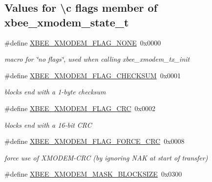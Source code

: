 \subsection*{Values for \textbackslash{}c flags member of xbee\-\_\-xmodem\-\_\-state\-\_\-t}
\begin{DoxyCompactItemize}
\item 
\hypertarget{group__util__xmodem_ga04349c37c905b515c4a61bbfbfefcac9}{\#define \hyperlink{group__util__xmodem_ga04349c37c905b515c4a61bbfbfefcac9}{X\-B\-E\-E\-\_\-\-X\-M\-O\-D\-E\-M\-\_\-\-F\-L\-A\-G\-\_\-\-N\-O\-N\-E}~0x0000}\label{group__util__xmodem_ga04349c37c905b515c4a61bbfbfefcac9}

\begin{DoxyCompactList}\small\item\em macro for \char`\"{}no flags\char`\"{}, used when calling xbee\-\_\-xmodem\-\_\-tx\-\_\-init \end{DoxyCompactList}\item 
\hypertarget{group__util__xmodem_ga3410ae9b9e3d434bb735ba6b6705f9f4}{\#define \hyperlink{group__util__xmodem_ga3410ae9b9e3d434bb735ba6b6705f9f4}{X\-B\-E\-E\-\_\-\-X\-M\-O\-D\-E\-M\-\_\-\-F\-L\-A\-G\-\_\-\-C\-H\-E\-C\-K\-S\-U\-M}~0x0001}\label{group__util__xmodem_ga3410ae9b9e3d434bb735ba6b6705f9f4}

\begin{DoxyCompactList}\small\item\em blocks end with a 1-\/byte checksum \end{DoxyCompactList}\item 
\hypertarget{group__util__xmodem_ga84ededd1cb6ac229e18cd5936943aa9e}{\#define \hyperlink{group__util__xmodem_ga84ededd1cb6ac229e18cd5936943aa9e}{X\-B\-E\-E\-\_\-\-X\-M\-O\-D\-E\-M\-\_\-\-F\-L\-A\-G\-\_\-\-C\-R\-C}~0x0002}\label{group__util__xmodem_ga84ededd1cb6ac229e18cd5936943aa9e}

\begin{DoxyCompactList}\small\item\em blocks end with a 16-\/bit C\-R\-C \end{DoxyCompactList}\item 
\hypertarget{group__util__xmodem_ga6c1de4e76820a95412e7db3faa9fd250}{\#define \hyperlink{group__util__xmodem_ga6c1de4e76820a95412e7db3faa9fd250}{X\-B\-E\-E\-\_\-\-X\-M\-O\-D\-E\-M\-\_\-\-F\-L\-A\-G\-\_\-\-F\-O\-R\-C\-E\-\_\-\-C\-R\-C}~0x0008}\label{group__util__xmodem_ga6c1de4e76820a95412e7db3faa9fd250}

\begin{DoxyCompactList}\small\item\em force use of X\-M\-O\-D\-E\-M-\/\-C\-R\-C (by ignoring N\-A\-K at start of transfer) \end{DoxyCompactList}\item 
\hypertarget{group__util__xmodem_gaaf04a39f137887085821e34f3e808ee1}{\#define \hyperlink{group__util__xmodem_gaaf04a39f137887085821e34f3e808ee1}{X\-B\-E\-E\-\_\-\-X\-M\-O\-D\-E\-M\-\_\-\-M\-A\-S\-K\-\_\-\-B\-L\-O\-C\-K\-S\-I\-Z\-E}~0x0300}\label{group__util__xmodem_gaaf04a39f137887085821e34f3e808ee1}


\end{DoxyCompactItemize}
